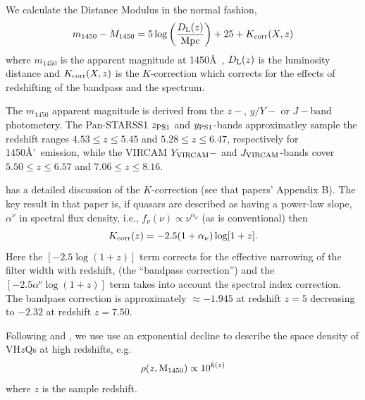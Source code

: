We calculate the Distance Modulus in the normal fashion, 
\begin{equation}
m_{1450} - M_{1450} = 5 \log \left (    \frac{ D_{\rm L}(z)}{\rm Mpc}  \right )  + 25 + K_{\rm corr}(X,z)
\end{equation}
where $m_{1450}$ is the apparent magnitude at 1450\AA\ ,  
$D_{\rm L}(z)$ is the luminosity distance and 
$K_{\rm corr}(X,z)$ is the $K$-correction which corrects for the effects of redshifting of the bandpass and the spectrum. 

The $m_{1450}$ apparent magnitude is derived from the $z-$, $y/Y-$ or $J-$band photometery.
The Pan-STARSS1 $z_{\rm PS1}$ and $y_{\rm PS1}$-bands approximatley
sample the redshift ranges $4.53\leq z \leq 5.45$ and $5.28\leq z \leq 6.47$, respectively 
for 1450\AA'\ emission, while the VIRCAM $Y_{\rm VIRCAM}-$ and $J_{\rm VIRCAM}$-bands 
cover $5.50\leq z \leq 6.57$ and $7.06\leq z \leq 8.16$. 

\citet{Ross2013} has a detailed discussion of the $K$-correction (see that papers' Appendix B). 
The key result in that paper is, if quasars are described as having a power-law slope, 
$\alpha^{\nu}$ in spectral flux density, i.e., $f_\nu(\nu) \propto \nu^{\alpha_{\nu}}$ (as is conventional) 
then 
\begin{equation}
K_{\rm corr}(z) = -2.5 (1 + \alpha_{\nu}) \log[1 + z].
\end{equation}
Here the $[-2.5 \log(1 + z)]$ term corrects for the effective narrowing of the filter width with redshift, (the ``bandpass correction'') and the $[-2.5 \alpha^{\nu} \log(1 + z)]$ term takes into account the spectral index correction. The bandpass correction is approximately $\approx -1.945$ at redshift $z=5$ decreasing to $-2.32$ at redshift $z=7.50$. 

Following \citet{Fan2001b} and \citet{McGreer2013}, we use use an
exponential decline to describe the space density of VH$z$Qs at high
redshifts, e.g.
\begin{equation}
\rho(z, {\rm M}_{1450}) \propto 10^{k (z)}
\end{equation}
where $z$ is the sample redshift. 
